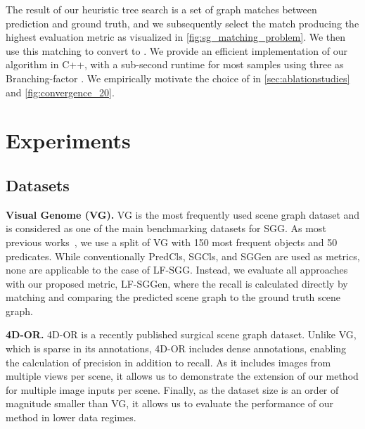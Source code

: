 \documentclass[10pt,twocolumn,letterpaper]{article}
\begin{document}
The result of our heuristic tree search is a set of graph matches between prediction and ground truth, and we subsequently select the match producing the highest evaluation metric as visualized in \cref{fig:sg_matching_problem}. We then use this matching to convert  to . We provide an efficient implementation of our algorithm in C++, with a sub-second runtime for most samples using three as Branching-factor . We empirically motivate the choice of  in \cref{sec:ablationstudies} and \cref{fig:convergence_20}. 

 

\section{Experiments} \subsection{Datasets}
\noindent\textbf{Visual Genome (VG).} VG is the most frequently used scene graph dataset and is considered as one of the main benchmarking datasets for SGG. As most previous works~\cite{teng_structured_2022}, we use a split of VG with 150 most frequent objects and 50 predicates. While conventionally PredCls, SGCls, and SGGen are used as metrics, none are applicable to the case of LF-SGG. Instead, we evaluate all approaches with our proposed metric, LF-SGGen, where the recall is calculated directly by matching and comparing the predicted scene graph to the ground truth scene graph.

\noindent\textbf{4D-OR.} 4D-OR is a recently published surgical scene graph dataset. Unlike VG, which is sparse in its annotations, 4D-OR includes dense annotations, enabling the calculation of precision in addition to recall. As it includes images from multiple views per scene, it allows us to demonstrate the extension of our method for multiple image inputs per scene. Finally, as the dataset size is an order of magnitude smaller than VG, it allows us to evaluate the performance of our method in lower data regimes. 
\end{document}
